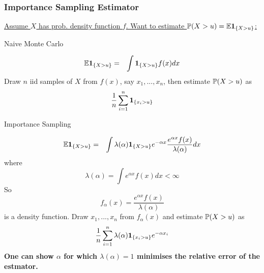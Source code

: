 \documentclass{beamer}
\begin{document}
\begin{frame}
  \frametitle{Importance Sampling Estimator}
  \underline{\scriptsize{Assume $X$ has prob. density function $f$. Want to estimate $\P(X
  > u) = \E \1{X > u}$:}}

  \begin{minipage}[t]{0.45\linewidth}
    \textcolor[HTML]{990033}{Naive Monte Carlo}
    \begin{scriptsize}
      \begin{eqnarray*}
        \E \1{X > u} &=& \int \1{X > u} f(x) dx
      \end{eqnarray*}
      Draw $n$ iid samples of $X$ from $f(x)$, say $x_1, ..., x_n$,
      then estimate $\P(X > u)$ as
      \[
      {1 \over n} \sum_{i=1}^n \1{x_i > u}
      \]
    \end{scriptsize}
  \end{minipage}\hfill
  \begin{minipage}[t]{0.5\linewidth}
    \textcolor[HTML]{990033}{Importance Sampling}
    \begin{tiny}
      \begin{eqnarray*}
        \E \1{X > u} &=& \int \lambda(\alpha)\1{X > u} e^{-\alpha x}
                         {e^{\alpha x} f(x) \over \lambda(\alpha)} dx
      \end{eqnarray*}
      where
      \[
      \lambda(\alpha) = \int e^{\alpha x} f(x) dx < \infty
      \]
      So
      \[
      f_\alpha(x) = \frac{e^{\alpha x} f(x)}{\lambda(\alpha)}
      \]
      is a density function. Draw $x_1, ..., x_n$ from
      $f_\alpha(x)$ and estimate $\P(X > u)$ as
      \[
      {1\over n}\sum_{i=1}^n \lambda(\alpha) \1{x_i > u} e^{-\alpha x_i}
      \]
      \bf{One can show $\alpha$ for which
        $\lambda(\alpha) = 1$ minimises the relative error of the
        estmator.}
    \end{tiny}
  \end{minipage}
\end{frame}
\end{document}
